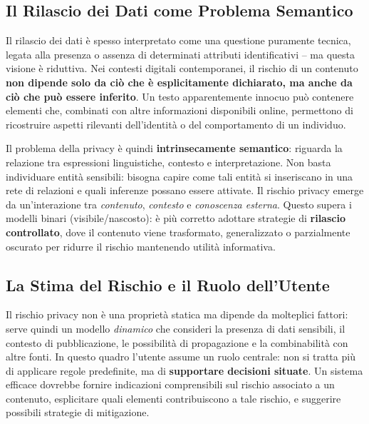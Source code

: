 \documentclass[12pt,a4paper]{article}
\begin{document}
\subsection{Il Rilascio dei Dati come Problema Semantico}

Il rilascio dei dati \`e spesso interpretato come una questione puramente tecnica, legata alla presenza o assenza di determinati attributi identificativi -- ma questa visione \`e riduttiva. Nei contesti digitali contemporanei, il rischio di un contenuto \textbf{non dipende solo da ci\`o che \`e esplicitamente dichiarato, ma anche da ci\`o che pu\`o essere inferito}. Un testo apparentemente innocuo pu\`o contenere elementi che, combinati con altre informazioni disponibili online, permettono di ricostruire aspetti rilevanti dell'identit\`a o del comportamento di un individuo.

\begin{defbox}
Il problema della privacy \`e quindi \textbf{intrinsecamente semantico}: riguarda la relazione tra espressioni linguistiche, contesto e interpretazione. Non basta individuare entit\`a sensibili: bisogna capire come tali entit\`a si inseriscano in una rete di relazioni e quali inferenze possano essere attivate. Il rischio privacy emerge da un'interazione tra \emph{contenuto}, \emph{contesto} e \emph{conoscenza esterna}. Questo supera i modelli binari (visibile/nascosto): \`e pi\`u corretto adottare strategie di \textbf{rilascio controllato}, dove il contenuto viene trasformato, generalizzato o parzialmente oscurato per ridurre il rischio mantenendo utilit\`a informativa.
\end{defbox}

\subsection{La Stima del Rischio e il Ruolo dell'Utente}

Il rischio privacy non \`e una propriet\`a statica ma dipende da molteplici fattori: serve quindi un modello \emph{dinamico} che consideri la presenza di dati sensibili, il contesto di pubblicazione, le possibilit\`a di propagazione e la combinabilit\`a con altre fonti. In questo quadro l'utente assume un ruolo centrale: non si tratta pi\`u di applicare regole predefinite, ma di \textbf{supportare decisioni situate}. Un sistema efficace dovrebbe fornire indicazioni comprensibili sul rischio associato a un contenuto, esplicitare quali elementi contribuiscono a tale rischio, e suggerire possibili strategie di mitigazione.
\end{document}
